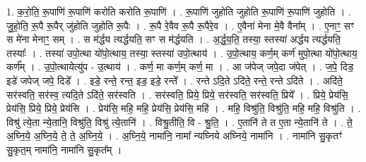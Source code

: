 \documentclass[17pt]{extarticle}
\begin{document}
1. क॒रो॒ति॒ रू॒पाणि॑ रू॒पाणि॑ करोति करोति रू॒पाणि॑ । . रू॒पाणि॑ जुहोति जुहोति रू॒पाणि॑ रू॒पाणि॑ जुहोति । . जु॒हो॒ति॒ रू॒पै रू॒पैर् जु॑होति जुहोति रू॒पैः । . रू॒पै रे॒वैव रू॒पै रू॒पैरे॒व । . ए॒वैना॑ मेना मे॒वै वैना᳚म् । . ए॒नाꣳ॒॒ सꣳ स मे॑ना मेनाꣳ॒॒ सम् । . स म॑र्द्धय त्यर्द्धयति॒ सꣳ स म॑र्द्धयति । . अ॒र्द्ध॒य॒ति॒ तस्या॒ स्तस्या॑ अर्द्धय त्यर्द्धयति॒ तस्याः᳚ । . तस्या॑ उपो॒त्था यो॑पो॒त्थाय॒ तस्या॒ स्तस्या॑ उपो॒त्थाय॑ । . उ॒पो॒त्थाय॒ कर्ण॒म् कर्ण॑ मुपो॒त्था यो॑पो॒त्थाय॒ कर्ण᳚म् । . उ॒पो॒त्थायेत्यु॑प - उ॒त्थाय॑ । . कर्ण॒ मा कर्ण॒म् कर्ण॒ मा । . आ ज॑पेज् जपे॒दा ज॑पेत् । . ज॒पे॒ दिड॒ इडे॑ जपेज् जपे॒ दिडे᳚ । . इडे॒ रन्ते॒ रन्त॒ इड॒ इडे॒ रन्ते᳚ । . रन्ते ऽदि॒ते ऽदि॑ते॒ रन्ते॒ रन्ते ऽदि॑ते । . अदि॑ते॒ सर॑स्वति॒ सर॑स्व॒ त्यदि॒ते ऽदि॑ते॒ सर॑स्वति । . सर॑स्वति॒ प्रिये॒ प्रिये॒ सर॑स्वति॒ सर॑स्वति॒ प्रिये᳚ । . प्रिये॒ प्रेय॑सि॒ प्रेय॑सि॒ प्रिये॒ प्रिये॒ प्रेय॑सि । . प्रेय॑सि॒ महि॒ महि॒ प्रेय॑सि॒ प्रेय॑सि॒ महि॑ । . महि॒ विश्रु॑ति॒ विश्रु॑ति॒ महि॒ महि॒ विश्रु॑ति । . विश्रु॑ त्ये॒ता न्ये॒तानि॒ विश्रु॑ति॒ विश्रु॑ त्ये॒तानि॑ । . विश्रु॒तीति॒ वि - श्रु॒ति॒ । . ए॒तानि॑ ते त ए॒ता न्ये॒तानि॑ ते । . ते॒ अ॒घ्नि॒ये॒ अ॒घ्नि॒ये॒ ते॒ ते॒ अ॒घ्नि॒ये॒ । . अ॒घ्नि॒ये॒ नामा॑नि॒ नामा᳚ न्यघ्निये अघ्निये॒ नामा॑नि । . नामा॑नि सु॒कृतꣳ॑ सु॒कृत॒म् नामा॑नि॒ नामा॑नि सु॒कृत᳚म् । \newline
\end{document}
